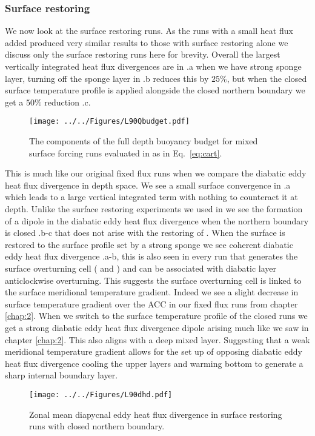 \subsubsection*{Surface restoring}
We now look at the surface restoring runs. As the runs with a small heat flux added produced very similar results to those with surface restoring alone we discuss only the surface restoring runs here for brevity. Overall the largest vertically integrated heat flux divergences are in .a when we have strong sponge layer, turning off the sponge layer in .b reduces this by $25\% $, but when the closed surface temperature profile is applied alongside the closed northern boundary we get a $50 \% $  reduction .c. 
\begin{figure}[H]
\center
\noindent \texttt{[image: ../../Figures/L90Qbudget.pdf]} 
\caption{The components of the full depth buoyancy budget for mixed surface forcing runs evaluated in as in \protect Eq.~\ref{eq:cart}.}
\label{fig:L90Qbudget}
\end{figure}
This is much like our original fixed flux runs when we compare the diabatic eddy heat flux divergence in depth space. We see a small surface convergence in .a which leads to a large vertical integrated term with nothing to counteract it at depth. Unlike the surface restoring experiments we used in  we see the formation of a dipole in the diabatic eddy heat flux divergence when the northern boundary is closed .b-c that does not arise with the restoring of \citet{Abernathey2014}. When the surface is restored to the surface profile set by a strong sponge we see coherent diabatic eddy heat flux divergence .a-b, this is also seen in every run that generates the surface overturning cell ( and ) and can be associated with diabatic layer anticlockwise overturning. This suggests the surface overturning cell is linked to the surface meridional temperature gradient. Indeed we see a slight decrease in surface temperature gradient over the ACC in our fixed flux runs from chapter \ref{chap:2}. When we switch to the surface temperature profile of the closed runs we get a strong diabatic eddy heat flux divergence dipole arising much like we saw in chapter \ref{chap:2}. This also aligns with a deep mixed layer. Suggesting that a weak meridional temperature gradient allows for the set up of opposing diabatic eddy heat flux divergence cooling the upper layers and warming bottom to generate a sharp internal boundary layer.
\begin{figure}[H]
\center
\noindent \texttt{[image: ../../Figures/L90dhd.pdf]} 
\caption{Zonal mean diapycnal eddy heat flux divergence in surface restoring runs with closed northern boundary.}
\label{fig:L90dhd}
\end{figure}


